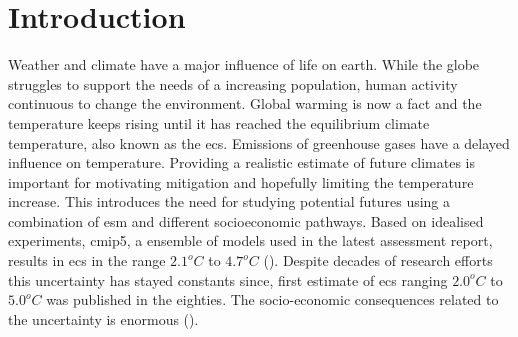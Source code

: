 \chapter{Introduction} \label{ch:introduction}
Weather and climate have a major influence of life on earth. While the globe struggles to support the needs of a increasing population, human activity continuous to change the environment. Global warming is now a fact and the temperature keeps rising until it has reached the equilibrium climate temperature, also known as the \acrfull{ecs}. Emissions of greenhouse gases have a delayed influence on temperature. Providing a realistic estimate of future climates is important for motivating mitigation and hopefully limiting the temperature increase. This introduces the need for studying potential futures using a combination of \acrfull{esm} and different socioeconomic pathways. Based on idealised experiments, \acrfull{cmip5}, a ensemble of models used in the latest assessment report, results in \acrshort{ecs} in the range $2.1^oC$ to $4.7^oC$ (\cite{IPCC_CH9_climate_models}). Despite decades of research efforts this uncertainty has stayed constants since, \cite{hansen} first estimate of \acrshort{ecs} ranging $2.0^oC$ to $5.0^oC$ was published in the eighties. The socio-economic consequences related to the uncertainty is enormous (\cite{bony2015}). 






